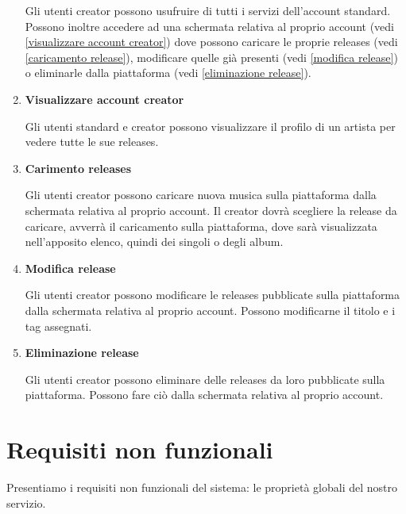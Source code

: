 \documentclass[a4paper,12pt]{article}
\begin{document}
\begin{enumerate}[label=\textbf{RF\arabic*}\;, ref=\textbf{RF\arabic*}]
    Gli utenti creator possono usufruire di tutti i servizi dell’account standard. Possono inoltre accedere ad una schermata relativa al proprio account (vedi \ref{visualizzare account creator}) dove possono caricare le proprie releases (vedi \ref{caricamento release}), modificare quelle già presenti (vedi \ref{modifica release}) o eliminarle dalla piattaforma (vedi \ref{eliminazione release}).
    \item \label{visualizzare account creator} \textbf{Visualizzare account creator}
    
    Gli utenti standard e creator possono visualizzare il profilo di un artista per vedere tutte le sue releases.
    \item \label{caricamento release} \textbf{Carimento releases}
    
    Gli utenti creator possono caricare nuova musica sulla piattaforma dalla schermata relativa al proprio account. Il creator dovrà scegliere la release da caricare, avverrà il caricamento sulla piattaforma, dove sarà visualizzata nell’apposito elenco, quindi dei singoli o degli album.
    \item \label{modifica release} \textbf{Modifica release}
    
    Gli utenti creator possono modificare le releases pubblicate sulla piattaforma dalla schermata relativa al proprio account. Possono modificarne il titolo e i tag assegnati. 
    \item \label{eliminazione release} \textbf{Eliminazione release}
    
    Gli utenti creator possono eliminare delle releases da loro pubblicate sulla piattaforma. Possono fare ciò dalla schermata relativa al proprio account.
\end{enumerate}

\newpage
\section{Requisiti non funzionali}

Presentiamo i requisiti non funzionali del sistema: le proprietà globali del nostro servizio.
\end{document}
